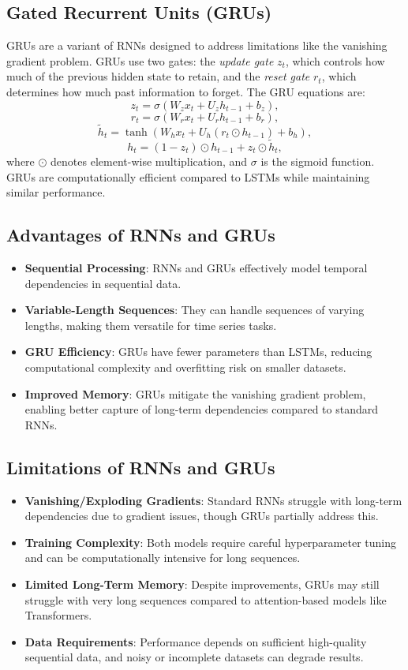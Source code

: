 \documentclass{article}
\begin{document}
\subsection{Gated Recurrent Units (GRUs)}
GRUs are a variant of RNNs designed to address limitations like the vanishing gradient problem. GRUs use two gates: the \textit{update gate} \( z_t \), which controls how much of the previous hidden state to retain, and the \textit{reset gate} \( r_t \), which determines how much past information to forget. The GRU equations are:
\[
z_t = \sigma(W_z x_t + U_z h_{t-1} + b_z),
\]
\[
r_t = \sigma(W_r x_t + U_r h_{t-1} + b_r),
\]
\[
\tilde{h}_t = \tanh(W_h x_t + U_h (r_t \odot h_{t-1}) + b_h),
\]
\[
h_t = (1 - z_t) \odot h_{t-1} + z_t \odot \tilde{h}_t,
\]
where \( \odot \) denotes element-wise multiplication, and \( \sigma \) is the sigmoid function. GRUs are computationally efficient compared to LSTMs while maintaining similar performance.

\subsection{Advantages of RNNs and GRUs}
\begin{itemize}
    \item \textbf{Sequential Processing}: RNNs and GRUs effectively model temporal dependencies in sequential data.
    \item \textbf{Variable-Length Sequences}: They can handle sequences of varying lengths, making them versatile for time series tasks.
    \item \textbf{GRU Efficiency}: GRUs have fewer parameters than LSTMs, reducing computational complexity and overfitting risk on smaller datasets.
    \item \textbf{Improved Memory}: GRUs mitigate the vanishing gradient problem, enabling better capture of long-term dependencies compared to standard RNNs.
\end{itemize}

\subsection{Limitations of RNNs and GRUs}
\begin{itemize}
    \item \textbf{Vanishing/Exploding Gradients}: Standard RNNs struggle with long-term dependencies due to gradient issues, though GRUs partially address this.
    \item \textbf{Training Complexity}: Both models require careful hyperparameter tuning and can be computationally intensive for long sequences.
    \item \textbf{Limited Long-Term Memory}: Despite improvements, GRUs may still struggle with very long sequences compared to attention-based models like Transformers.
    \item \textbf{Data Requirements}: Performance depends on sufficient high-quality sequential data, and noisy or incomplete datasets can degrade results.
\end{itemize}
\end{document}
